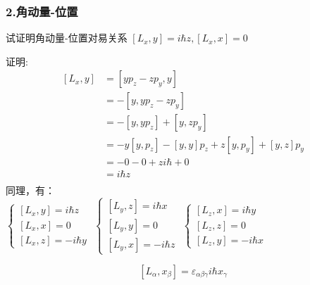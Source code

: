 \begin{frame} [allowframebreaks=]
    \frametitle{2.角动量-位置}
    \begin{exampleblock}{}
     试证明角动量-位置对易关系 $[L_x,y]=i\hbar z,  [L_x,x]=0$
    \end{exampleblock}
    \alert{证明:} 
    \begin{equation*}
        \begin{split}
        [L_x,y]&= [yp_z-zp_y,y]\\
        &=-[y,yp_z-zp_y]\\
        &= -[y,yp_z] + [y,zp_y]\\
        &=-y[y,p_z] -[y,y]p_z + z[y,p_y] + [y,z]p_y\\
        &=-0 -0 + z i\hbar + 0\\
        &=i\hbar z \\
        \end{split}  
    \end{equation*}
    同理，有：\\
    $\begin{cases}
        [L_x,y]= i\hbar z  \\ 
        [L_x,x]= 0  \\ 
        [L_x,z]= -i\hbar y 
    \end{cases}$
    $\begin{cases}
        [L_y,z]= i\hbar x  \\ 
        [L_y,y]= 0  \\ 
        [L_y,x]= -i\hbar z 
    \end{cases}$
    $\begin{cases}
        [L_z,x]= i\hbar y  \\ 
        [L_z,z]= 0  \\ 
        [L_z,y]= -i\hbar x 
    \end{cases}$
    \begin{tcolorbox}[colback=yellow!5,colframe=red!75!black,title=角动量-位置对易关系]
        $$ [L_\alpha,x_\beta]= \varepsilon_{\alpha\beta\gamma} i\hbar x_\gamma $$ 
    \end{tcolorbox}
\end{frame} 

